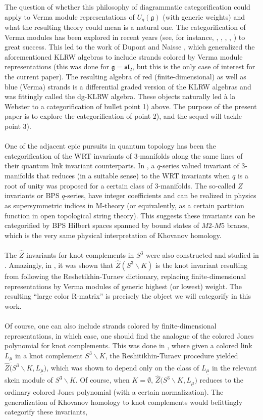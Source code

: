 \documentclass{article}
\begin{document}
The question of whether this philosophy of diagrammatic categorification could apply to Verma module representations of $U_q(\mathfrak{g})$ (with generic weights) and what the resulting theory could mean is a natural one. The categorification of Verma modules has been explored in recent years (see, for instance, \cite{Na6}, \cite{Na5}, \cite{Na4}, \cite{Na2}, \cite{Rou2}) to great success. This led to the work of Dupont and Naisse \cite{Na}, which generalized the aforementioned KLRW algebras to include strands colored by Verma module representations (this was done for $\mathfrak{g}=\mathfrak{sl_2}$, but this is the only case of interest for the current paper). The resulting algebra of red (finite-dimensional) as well as blue (Verma) strands is a differential graded version of the KLRW algebras and was fittingly called the dg-KLRW algebra. These objects naturally led à la Webster to a categorification of bullet point 1) above. The purpose of the present paper is to explore the categorification of point 2), and the sequel will tackle point 3). \\ \\
One of the adjacent epic pursuits in quantum topology has been the categorification of the WRT invariants of $3$-manifolds along the same lines of their quantum link invariant counterparts. In \cite{GPPV}, a $q$-series valued invariant of $3$-manifolds that reduces (in a suitable sense) to the WRT invariants when $q$ is a root of unity was proposed for a certain class of 3-manifolds. The so-called $\hat{Z}$ invariants or BPS $q$-series, have integer coefficients and can be realized in physics as supersymmetric indices in M-theory (or equivalently, as a certain partition function in open topological string theory). This suggests these invariants can be categorified by BPS Hilbert spaces spanned by bound states of $M2$-$M5$ branes, which is the very same physical interpretation of Khovanov homology. \\ \\
The $\hat{Z}$ invariants for knot complements in $S^3$ were also constructed and studied in \cite{GM}. Amazingly, in \cite{Park}, it was shown that $\hat{Z}(S^3\backslash K)$ is the knot invariant resulting from following the Reshetikhin-Turaev dictionary, replacing finite-dimensional representations by Verma modules of generic highest (or lowest) weight. The resulting ``large color R-matrix'' is precisely the object we will categorify in this work. \\ \\
Of course, one can also include strands colored by finite-dimensional representations, in which case, one should find the analogue of the colored Jones polynomial for knot complements. This was done in \cite{Park2}, where given a colored link $L_{\underline{\mu}}$ in a knot complement $S^3\backslash K$, the Reshitikhin-Turaev procedure yielded $\hat{Z}\big(S^3\backslash K,L_{\underline{\mu}} \big)$, which was shown to depend only on the class of $L_{\underline{\mu}}$ in the relevant skein module of $S^3\backslash K$. Of course, when $K=\emptyset$, $\hat{Z}\big(S^3\backslash K,L_{\underline{\mu}} \big)$ reduces to the ordinary colored Jones polynomial (with a certain normalization). The generalization of Khovanov homology to knot complements would befittingly categorify these invariants, 
\end{document}
